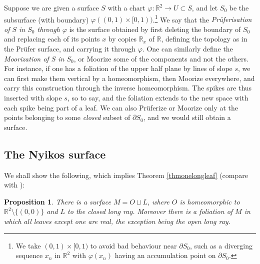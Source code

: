 \documentclass{amsart}
\newtheorem{prop}[theorem]{Proposition}
\begin{document}
Suppose we are given a surface $S$ with a chart $\varphi:{\mathbb R}^2\to U\subset S$, and let $S_0$ be the subsurface (with boundary) $\varphi((0,1)\times[0,1))$.\footnote{We take $(0,1)\times[0,1)$ to avoid bad behaviour near $\partial S_0$, such as a diverging sequence $x_n$ in ${\mathbb R}^2$ with $\varphi(x_n)$ having an accumulation point on $\partial S_0$.} We say that the {\em Pr\"uferisation of $S$ in $S_0$ through $\varphi$} is the surface obtained by first deleting the boundary of $S_0$ and replacing each of its points $x$ by copies ${\mathbb R}_x$ of ${\mathbb R}$, defining the topology as in the Pr\"ufer surface, and carrying it through $\varphi$. One can similarly define the {\em Moorization of $S$ in $S_0$}, or Moorize some of the components and not the others. For instance, if one has a foliation of the upper half plane by lines of slope $s$, we can first make them vertical by a homeomorphism, then Moorize everywhere, and carry this construction through the inverse homeomorphism. The spikes are thus inserted with slope $s$, so to say, and the foliation extends to the new space with each spike being part of a leaf. We can also Pr\"uferize or Moorize only at the points belonging to some {\em closed} subset of $\partial S_0$, and we would still obtain a surface.

\subsection{The Nyikos surface}\label{subsectionkiekie}

We shall show the following, which implies Theorem \ref{thmonelongleaf}
(compare with \cite[Examples 6.3 and 6.7]{Nyikos90}):

\begin{prop}\label{thmkiekie}
There is a surface $M=O\sqcup L$, where $O$ is homeomorphic to $\mathbb R^2\setminus\{(0,0)\}$ and $L$ to the closed long ray. 
 Moreover there is a foliation of $M$ in which all leaves except one are real, the exception being the open long ray.
\end{prop}
\end{document}
